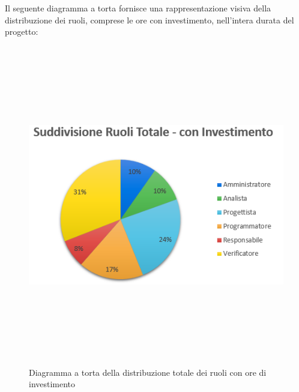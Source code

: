 Il seguente diagramma a torta fornisce una rappresentazione visiva della distribuzione dei ruoli, comprese le ore con investimento, nell'intera durata del progetto:

\begin{figure}[htbp]
\centering
\includegraphics[width=14cm,height=14cm,keepaspectratio]{./img/ProspettoOrario/SRTotInv.png}
\caption[Totale con investimento - Diagramma a torta suddivisione ruoli]{Diagramma a torta della distribuzione totale dei ruoli con ore di investimento}
\end{figure}

\newpage

